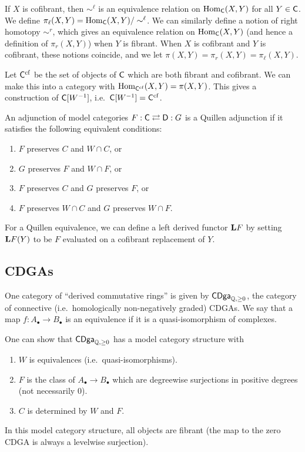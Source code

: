 \documentclass{amsart}
\begin{document}
If $X$ is cofibrant, then $\sim^\ell$ is an equivalence relation on $\operatorname{Hom}_{\mathsf{C}}(X, Y)$ for all $Y \in \mathsf{C}$.
We define $\pi_\ell(X, Y) = \operatorname{Hom}_{\mathsf{C}}(X, Y) / \sim^\ell$.
We can similarly define a notion of right homotopy $\sim^r$, which gives an equivalence relation on $\operatorname{Hom}_{\mathsf{C}}(X, Y)$ (and hence a definition of $\pi_r(X, Y)$) when $Y$ is fibrant.
When $X$ is cofibrant and $Y$ is cofibrant, these notions coincide, and we let $\pi(X, Y) = \pi_r(X, Y) = \pi_\ell(X, Y)$.

Let $\mathsf{C}^{\mathrm{cf}}$ be the set of objects of $\mathsf{C}$ which are both fibrant and cofibrant.
We can make this into a category with $\operatorname{Hom}_{\mathsf{C}^{\mathrm{cf}}}(X, Y) = \pi(X, Y)$.
This gives a construction of $\mathsf{C}[W^{-1}]$, i.e.\ $\mathsf{C}[W^{-1}] = \mathsf{C}^{\mathrm{cf}}$.

\begin{dfn}
	An adjunction of model categories $F: \mathsf{C} \rightleftarrows \mathsf{D} : G$ is a Quillen adjunction if it satisfies the following equivalent conditions:
	\begin{enumerate}
		\item $F$ preserves $C$ and $W \cap C$, or
		\item $G$ preserves $F$ and $W \cap F$, or
		\item $F$ preserves $C$ and $G$ preserves $F$, or
		\item $F$ preserves $W \cap C$ and $G$ preserves $W \cap F$.
	\end{enumerate}
\end{dfn}

For a Quillen equivalence, we can define a left derived functor $\mathbf{L} F$ by setting $\mathbf{L} F(Y)$ to be $F$ evaluated on a cofibrant replacement of $Y$.

\subsection{CDGAs}

One category of ``derived commutative rings'' is given by $\mathsf{CDga}_{\mathbb{Q},\geq 0}$, the category of connective (i.e.\ homologically non-negatively graded) CDGAs.
We say that a map $f: A_\bullet \to B_\bullet$ is an equivalence if it is a quasi-isomorphism of complexes.

One can show that $\mathsf{CDga}_{\mathbb{Q}, \geq 0}$ has a model category structure with
\begin{enumerate}
	\item $W$ is equivalences (i.e.\ quasi-isomorphisms).
	\item $F$ is the class of $A_\bullet \to B_\bullet$ which are degreewise surjections in positive degrees (not necessarily $0$).
	\item $C$ is determined by $W$ and $F$.
\end{enumerate}
In this model category structure, all objects are fibrant (the map to the zero CDGA is always a levelwise surjection).
\end{document}
